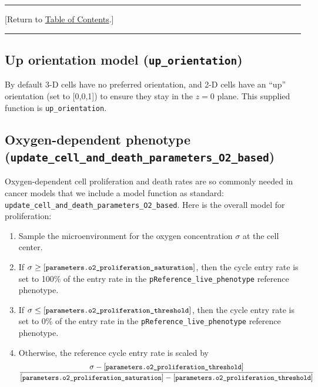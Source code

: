 \documentclass[12pt]{article}
\newcommand{\beq}{\begin{equation}}
\newcommand{\eeq}{\end{equation}}
\renewcommand{\v}{\verb}
\renewcommand{\tt}[1]{{\small \left[\texttt{#1}\right] }}
\newcommand{\TOClink}{\begin{center}\hrule\vskip-10pt\phantom{.}\hfill[Return to \hyperlink{TOC}{Table of Contents}.]\hfill\phantom{.}\vskip3pt\hrule\end{center}}
\begin{document}
\TOClink 

\subsection{Up orientation model (\texttt{up\_orientation})}
\label{sec:Standard_Models:Orientation}
By default 3-D cells have no preferred orientation, and 2-D cells 
have an ``up'' orientation (set to [0,0,1]) to ensure they stay 
in the $z=0$ plane. This supplied function is 
\v|up_orientation|. 

\subsection{Oxygen-dependent phenotype \\
(\texttt{update\_cell\_and\_death\_parameters\_O2\_based})}
\label{sec:Standard_Models:Microenvironment_Phenotype}
Oxygen-dependent cell proliferation and death rates are so commonly 
needed in cancer models that we include a model function 
as standard: 
\v|update_cell_and_death_parameters_O2_based|. Here is the 
overall model for proliferation: 

\begin{enumerate}
\item 
Sample the microenvironment for the oxygen concentration 
$\sigma$ at the 
cell center. 
\item 
If $\sigma \ge \tt{parameters.o2\_proliferation\_saturation}$, 
then the cycle entry rate is set to 100\% of the entry rate 
in the \v|pReference_live_phenotype| reference phenotype. 

\item 
If $\sigma \le \tt{parameters.o2\_proliferation\_threshold}$, 
then the cycle entry rate is set to 0\% of the entry rate 
in the \v|pReference_live_phenotype| reference phenotype. 

\item 
Otherwise, the reference cycle entry rate is scaled by 
\beq
\frac{ \sigma - 
\tt{parameters.o2\_proliferation\_threshold} }
{ \tt{parameters.o2\_proliferation\_saturation} - 
\tt{parameters.o2\_proliferation\_threshold} }
\eeq

\end{enumerate}

%
%
%
\end{document}
